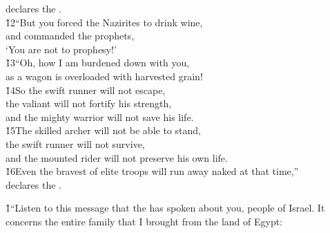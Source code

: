 \begin{poetry}
\poemll    declares the . \\
\poeml \v{12}``But you forced the Nazirites to drink wine, \\
\poemll    and commanded the prophets, \\
\poemlll       `You are not to prophesy!' \\
\poeml \v{13}``Oh, how I am burdened down with you, \\
\poemll    as a wagon is overloaded with harvested grain! \\
\poeml \v{14}So the swift runner will not escape, \\
\poemll    the valiant will not fortify his strength, \\
\poemlll       and the mighty warrior will not save his life. \\
\poeml \v{15}The skilled archer will not be able to stand, \\
\poemll    the swift runner will not survive, \\
\poemlll       and the mounted rider will not preserve his own life. \\
\poeml \v{16}Even the bravest of elite troops will run away naked at that time,'' \\
\poemll    declares the .
\end{poetry}

\v{1}``Listen to this message that the  has spoken about you, people of Israel. It concerns the entire family that I brought from the land of Egypt:

